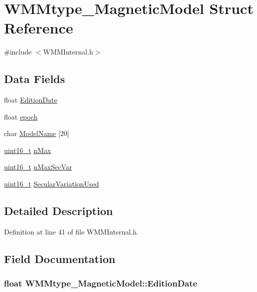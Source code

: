 \hypertarget{struct_w_m_mtype___magnetic_model}{\section{W\-M\-Mtype\-\_\-\-Magnetic\-Model Struct Reference}
\label{struct_w_m_mtype___magnetic_model}
}


{\ttfamily \#include $<$W\-M\-M\-Internal.\-h$>$}

\subsection*{Data Fields}
\begin{DoxyCompactItemize}
\item 
float \hyperlink{struct_w_m_mtype___magnetic_model_ac71e1248c6059e2808a805c55977b143}{Edition\-Date}
\item 
float \hyperlink{struct_w_m_mtype___magnetic_model_a49af71fa7bdc1e238de0f59b941ab70c}{epoch}
\item 
char \hyperlink{struct_w_m_mtype___magnetic_model_a11d5a44016770e140c397467b40c7755}{Model\-Name} \mbox{[}20\mbox{]}
\item 
\hyperlink{stdint_8h_a273cf69d639a59973b6019625df33e30}{uint16\-\_\-t} \hyperlink{struct_w_m_mtype___magnetic_model_ad87a370d713ab72ff5ca801d1a3a2d4c}{n\-Max}
\item 
\hyperlink{stdint_8h_a273cf69d639a59973b6019625df33e30}{uint16\-\_\-t} \hyperlink{struct_w_m_mtype___magnetic_model_a957006fac5ca68a6c677f6f09d0c05b4}{n\-Max\-Sec\-Var}
\item 
\hyperlink{stdint_8h_a273cf69d639a59973b6019625df33e30}{uint16\-\_\-t} \hyperlink{struct_w_m_mtype___magnetic_model_a75df8ef8af2f06cf375592712bb491d0}{Secular\-Variation\-Used}
\end{DoxyCompactItemize}


\subsection{Detailed Description}


Definition at line 41 of file W\-M\-M\-Internal.\-h.



\subsection{Field Documentation}
\hypertarget{struct_w_m_mtype___magnetic_model_ac71e1248c6059e2808a805c55977b143}{
\subsubsection[{Edition\-Date}]{\setlength{\rightskip}{0pt plus 5cm}float W\-M\-Mtype\-\_\-\-Magnetic\-Model\-::\-Edition\-Date}}\label{struct_w_m_mtype___magnetic_model_ac71e1248c6059e2808a805c55977b143}



